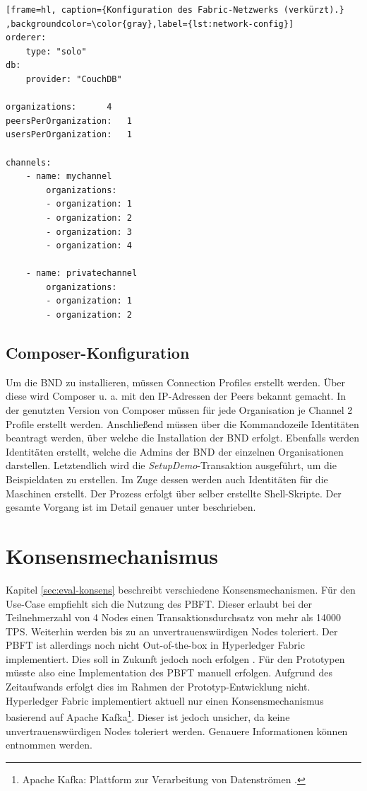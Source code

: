 \begin{lstfloat}
\begin{lstlisting}[frame=hl, caption={Konfiguration des Fabric-Netzwerks (verkürzt).} ,backgroundcolor=\color{gray},label={lst:network-config}]
orderer:
    type: "solo"
db:
    provider: "CouchDB"

organizations:      4
peersPerOrganization:   1
usersPerOrganization:   1

channels:
    - name: mychannel
        organizations:
        - organization: 1
        - organization: 2
        - organization: 3
        - organization: 4

    - name: privatechannel
        organizations:
        - organization: 1
        - organization: 2
\end{lstlisting} 
\end{lstfloat}

\subsection{Composer-Konfiguration}
Um die \acs{BND} zu installieren, müssen Connection Profiles erstellt werden. Über diese wird Composer u. a. mit den IP-Adressen der Peers bekannt gemacht. In der genutzten Version von Composer müssen für jede Organisation je Channel 2 Profile erstellt werden. Anschließend müssen über die Kommandozeile Identitäten beantragt werden, über welche die Installation der \acs{BND} erfolgt. Ebenfalls werden Identitäten erstellt, welche die Admins der \acs{BND} der einzelnen Organisationen darstellen. Letztendlich wird die \textit{SetupDemo}-Transaktion ausgeführt, um die Beispieldaten zu erstellen. Im Zuge dessen werden auch Identitäten für die Maschinen erstellt. Der Prozess erfolgt über selber erstellte Shell-Skripte. Der gesamte Vorgang ist im Detail genauer unter \cite{HyperledgerComposerTeamMultiOrgDeployment} beschrieben.

\section{Konsensmechanismus}
\label{sec:consensus-choose}
Kapitel \ref{sec:eval-konsens} beschreibt verschiedene Konsensmechanismen. Für den Use-Case empfiehlt sich die Nutzung des PBFT. Dieser erlaubt bei der Teilnehmerzahl von 4 Nodes einen Transaktionsdurchsatz von mehr als 14000 \acs{TPS}. Weiterhin werden bis zu  an unvertrauenswürdigen Nodes toleriert. Der PBFT ist allerdings noch nicht Out-of-the-box in Hyperledger Fabric implementiert. Dies soll in Zukunft jedoch noch erfolgen \cite{HyperledgerFabricTeamPluggableConsensusImplementations}. Für den Prototypen müsste also eine Implementation des PBFT manuell erfolgen. Aufgrund des Zeitaufwands erfolgt dies im Rahmen der Prototyp-Entwicklung nicht. Hyperledger Fabric implementiert aktuell nur einen Konsensmechanismus basierend auf Apache Kafka\footnote{Apache Kafka: Plattform zur Verarbeitung von Datenströmen \cite{ApacheIntroductionApacheKafka}.}. Dieser ist jedoch unsicher, da keine unvertrauenswürdigen Nodes toleriert werden. Genauere Informationen können \cite{CachinBlockchainConsensusProtocols2017} entnommen werden.

